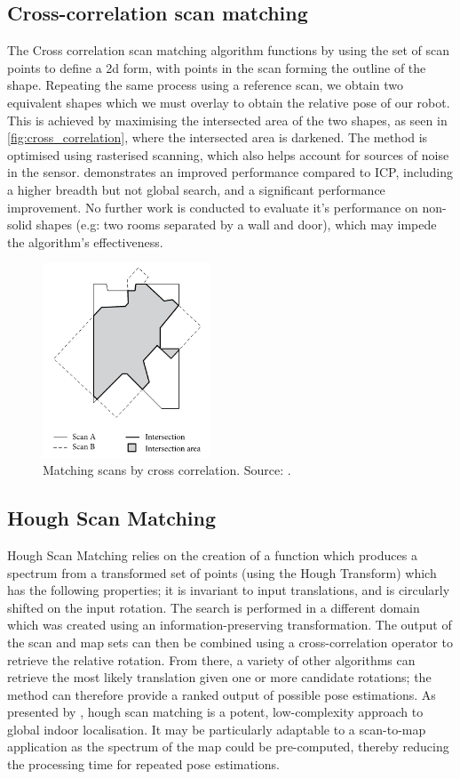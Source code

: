 \documentclass[authoryearcitations]{UoYCSproject}
\begin{document}
\subsection{Cross-correlation scan matching}
The Cross correlation scan matching algorithm functions by using the set of scan points to define a 2d form, with points in the scan forming the outline of the shape. Repeating the same process using a reference scan, we obtain two equivalent shapes which we must overlay to obtain the relative pose of our robot. This is achieved by maximising the intersected area of the two shapes, as seen in \autoref{fig:cross_correlation}, where the intersected area is darkened. The method is optimised using rasterised scanning, which also helps account for sources of noise in the sensor. \citet{Konecny2016-zv} demonstrates an improved performance compared to ICP, including a higher breadth but not global search, and a significant performance improvement. No further work is conducted to evaluate it's performance on non-solid shapes (e.g: two rooms separated by a wall and door), which may impede the algorithm's effectiveness. 

\begin{figure}[t]
	\centering
	\includegraphics[width=5cm,keepaspectratio]{images/cross_correlation.png}
	\caption[Cross correlation scan matching]{Matching scans by cross correlation. Source: \citet{Konecny2016-zv}.}
	\label{fig:cross_correlation}
\end{figure}

\subsection{Hough Scan Matching}
\label{subsec:hough}
Hough Scan Matching relies on the creation of a function which produces a spectrum from a transformed set of points (using the Hough Transform) which has the following properties; it is invariant to input translations, and is circularly shifted on the input rotation. The search is performed in a different domain which was created using an information-preserving transformation. The output of the scan and map sets can then be combined using a cross-correlation operator to retrieve the relative rotation. From there, a variety of other algorithms can retrieve the most likely translation given one or more candidate rotations; the method can therefore provide a ranked output of possible pose estimations. As presented by \citet{Censi2005-iv}, hough scan matching is a potent, low-complexity approach to global indoor localisation. It may be particularly adaptable to a scan-to-map application as the spectrum of the map could be pre-computed, thereby reducing the processing time for repeated pose estimations.
\end{document}
